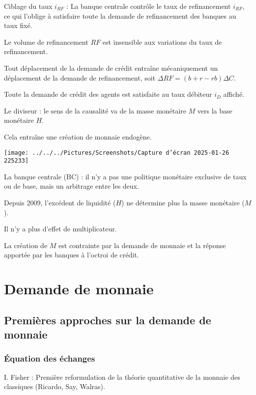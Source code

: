 \documentclass[a4paper, 12pt]{report}
\begin{document}
Ciblage du taux \( i_{RF} \) : La banque centrale contrôle le taux de refinancement \( i_{RF} \), ce qui l'oblige à satisfaire toute la demande de refinancement des banques au taux fixé.  

Le volume de refinancement \( RF \) est insensible aux variations du taux de refinancement.  

Tout déplacement de la demande de crédit entraîne mécaniquement un déplacement de la demande de refinancement, soit \( \Delta RF = (b+r-rb) \Delta C \).  

Toute la demande de crédit des agents est satisfaite au taux débiteur \( i_D \) affiché.  

Le diviseur : le sens de la causalité va de la masse monétaire \( M \) vers la base monétaire \( H \).  

Cela entraîne une création de monnaie endogène.

\begin{center}
	\texttt{[image: ../../../Pictures/Screenshots/Capture d'écran 2025-01-26 225233]}
\end{center}
	
La banque centrale (BC) : il n'y a pas une politique monétaire exclusive de taux ou de base, mais un arbitrage entre les deux.  

Depuis 2009, l'excédent de liquidité (\( H \)) ne détermine plus la masse monétaire (\( M \)).  

Il n'y a plus d'effet de multiplicateur.  

La création de \( M \) est contrainte par la demande de monnaie et la réponse apportée par les banques à l'octroi de crédit.
	
\section{Demande de monnaie}	
	
\subsection{Premières approches sur la demande de monnaie}
	
\subsubsection{Équation des échanges}
	
I. Fisher : Première reformulation de la théorie quantitative de la monnaie des classiques (Ricardo, Say, Walras).  
\end{document}
